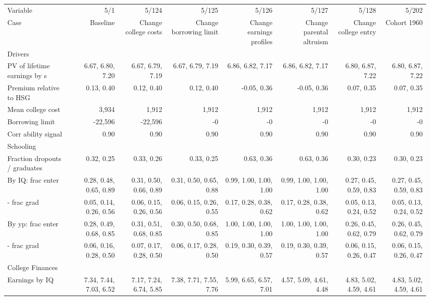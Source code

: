 \begin{tabular}{lrrrrrrr}
\hline
Variable & 5/1  & 5/124  & 5/125  & 5/126  & 5/127  & 5/128  & 5/202  \\ 
Case & Baseline  & Change college costs  & Change borrowing limit  & Change earnings profiles  & Change parental altruism  & Change college entry  & Cohort 1960  \\ 
Drivers &   &   &   &   &   &   &   \\ 
PV of lifetime earnings by s & 6.67, 6.80, 7.20  & 6.67, 6.79, 7.19  & 6.67, 6.79, 7.19  & 6.86, 6.82, 7.17  & 6.86, 6.82, 7.17  & 6.80, 6.87, 7.22  & 6.80, 6.87, 7.22  \\ 
Premium relative to HSG & 0.13, 0.40  & 0.12, 0.40  & 0.12, 0.40  & -0.05, 0.36  & -0.05, 0.36  & 0.07, 0.35  & 0.07, 0.35  \\ 
Mean college cost & 3,934  & 1,912  & 1,912  & 1,912  & 1,912  & 1,912  & 1,912  \\ 
Borrowing limit & -22,596  & -22,596  & -0  & -0  & -0  & -0  & -0  \\ 
Corr ability signal & 0.90  & 0.90  & 0.90  & 0.90  & 0.90  & 0.90  & 0.90  \\ 
\hline
Schooling &   &   &   &   &   &   &   \\ 
Fraction dropouts / graduates & 0.32, 0.25  & 0.33, 0.26  & 0.33, 0.25  & 0.63, 0.36  & 0.63, 0.36  & 0.30, 0.23  & 0.30, 0.23  \\ 
By IQ: frac enter & 0.28, 0.48, 0.65, 0.89  & 0.31, 0.50, 0.66, 0.89  & 0.31, 0.50, 0.65, 0.88  & 0.99, 1.00, 1.00, 1.00  & 0.99, 1.00, 1.00, 1.00  & 0.27, 0.45, 0.59, 0.83  & 0.27, 0.45, 0.59, 0.83  \\ 
- frac grad & 0.05, 0.14, 0.26, 0.56  & 0.06, 0.15, 0.26, 0.56  & 0.06, 0.15, 0.26, 0.55  & 0.17, 0.28, 0.38, 0.62  & 0.17, 0.28, 0.38, 0.62  & 0.05, 0.13, 0.24, 0.52  & 0.05, 0.13, 0.24, 0.52  \\ 
By yp: frac enter & 0.28, 0.49, 0.68, 0.85  & 0.31, 0.51, 0.68, 0.85  & 0.30, 0.50, 0.68, 0.85  & 1.00, 1.00, 1.00, 1.00  & 1.00, 1.00, 1.00, 1.00  & 0.26, 0.45, 0.62, 0.79  & 0.26, 0.45, 0.62, 0.79  \\ 
- frac grad & 0.06, 0.16, 0.28, 0.50  & 0.07, 0.17, 0.28, 0.50  & 0.06, 0.17, 0.28, 0.50  & 0.19, 0.30, 0.39, 0.57  & 0.19, 0.30, 0.39, 0.57  & 0.06, 0.15, 0.26, 0.47  & 0.06, 0.15, 0.26, 0.47  \\ 
\hline
College Finances &   &   &   &   &   &   &   \\ 
Earnings by IQ & 7.34, 7.44, 7.03, 6.52  & 7.17, 7.24, 6.74, 5.85  & 7.38, 7.71, 7.55, 7.76  & 5.99, 6.65, 6.57, 7.01  & 4.57, 5.09, 4.61, 4.48  & 4.83, 5.02, 4.59, 4.61  & 4.83, 5.02, 4.59, 4.61  \\ 

\end{tabular}
